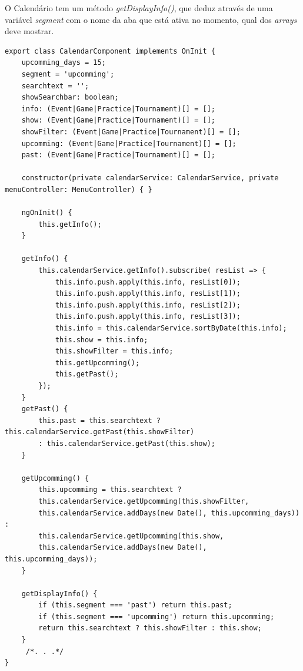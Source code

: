 O Calendário tem um método \textit{getDisplayInfo()}, que deduz através de uma variável \textit{segment} com o nome da aba que está ativa no momento, qual dos \textit{arrays} deve mostrar.

\begin{lstlisting}
export class CalendarComponent implements OnInit {
	upcomming_days = 15;
	segment = 'upcomming';
	searchtext = '';
	showSearchbar: boolean;
	info: (Event|Game|Practice|Tournament)[] = [];
	show: (Event|Game|Practice|Tournament)[] = [];
	showFilter: (Event|Game|Practice|Tournament)[] = [];
	upcomming: (Event|Game|Practice|Tournament)[] = [];
	past: (Event|Game|Practice|Tournament)[] = [];
	
	constructor(private calendarService: CalendarService, private menuController: MenuController) { }
	
	ngOnInit() {
		this.getInfo();
	}
	
	getInfo() {
		this.calendarService.getInfo().subscribe( resList => {
			this.info.push.apply(this.info, resList[0]);
			this.info.push.apply(this.info, resList[1]);
			this.info.push.apply(this.info, resList[2]);
			this.info.push.apply(this.info, resList[3]);
			this.info = this.calendarService.sortByDate(this.info);
			this.show = this.info;
			this.showFilter = this.info;
			this.getUpcomming();
			this.getPast();
		});
	}
	getPast() {
		this.past = this.searchtext ? this.calendarService.getPast(this.showFilter)
		: this.calendarService.getPast(this.show);
	}
	
	getUpcomming() {
		this.upcomming = this.searchtext ?
		this.calendarService.getUpcomming(this.showFilter,
		this.calendarService.addDays(new Date(), this.upcomming_days)) :
		this.calendarService.getUpcomming(this.show,
		this.calendarService.addDays(new Date(), this.upcomming_days));
	}
	
	getDisplayInfo() {
		if (this.segment === 'past') return this.past;
		if (this.segment === 'upcomming') return this.upcomming;
		return this.searchtext ? this.showFilter : this.show;
	}
	 /*. . .*/
}
\end{lstlisting}


